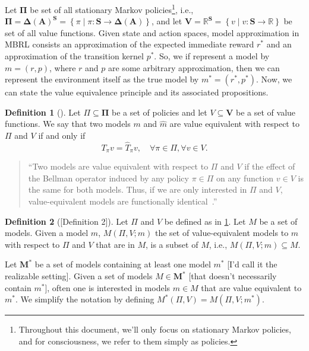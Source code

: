 \documentclass[a4paper]{article}
\theoremstyle{definition}
\newtheorem{definition}{Definition}
\theoremstyle{remark}
\theoremstyle{plain}
\newcommand{\bA}{\mathbf{A}}
\newcommand{\bS}{\mathbf{S}}
\newcommand{\bM}{\mathbf{M}}
\newcommand{\bV}{\mathbf{V}}
\newcommand{\bPi}{\mathbf{\Pi}}
\newcommand{\bDelta}{\mathbf{\Delta}}
\newcommand{\R}{\mathbb{R}}
\begin{document}
Let $\bPi$ be set of all stationary Markov policies\footnote{Throughout this document, we'll only focus on stationary Markov policies, and for consciousness, we refer to them simply as policies.}, i.e., $\bPi = {\bDelta(\bA)}^{\bS} = \left\{\pi \mid \pi: \bS \to \bDelta(\bA) \right\}$, and let $\bV = \R^{\bS} = \left\{v\mid v: \bS \to \R \right\}$ be set of all value functions. Given state and action spaces, model approximation in MBRL consists an approximation of the expected immediate reward $r^*$ and an approximation of the transition kernel $p^*$. So, we if represent a model by $m = (r, p)$, where $r$ and $p$ are some arbitrary approximation, then we can represent the environment itself as the true model by $m^* = (r^*, p^*)$. Now, we can state the value equivalence principle and its associated propositions.
%
\begin{definition}[{\normalfont\citet[Definition 1]{grimm2020value}}]
\label{def:val-eqvlnc}
Let $\Pi \subseteq \bPi$ be a set of policies and let $V \subseteq \bV$ be a set of value functions. We say that two models $m$ and $\hat{m}$ are value equivalent with respect to $\Pi$ and $V$ if and only if
\begin{equation*}
    T_\pi v = \hat{T}_\pi v, \quad \forall\pi \in \Pi, \forall v \in V.
\end{equation*}
\end{definition}
\begin{quote}
    ``Two models are value equivalent with respect to $\Pi$ and $V$ if the effect of the Bellman operator induced by any policy $\pi \in \Pi$ on any function $v \in V$ is the same for both models. Thus, if we are only interested in $\Pi$ and $V$, value-equivalent models are functionally identical~\citep{grimm2020value}.''
\end{quote}
%
\begin{definition}[{\normalfont\citet{grimm2020value}[Definition 2]}]
Let $\Pi$ and $V$ be defined as in \cref{def:val-eqvlnc}. Let $M$ be a set of models. Given a model $m$, $M(\Pi, V; m)$ the set of value-equivalent models to $m$ with respect to $\Pi$ and $V$ that are in $M$, is a subset of $M$, i.e., $M(\Pi, V; m) \subseteq M$.
\end{definition}
%
Let $\bM^*$ be a set of models containing at least one model $m^*$ [I'd call it the realizable setting]. Given a set of models $M \in \bM^*$ [that doesn't necessarily contain $m^*$], often one is interested in models $m \in M$ that are value equivalent to $m^*$. We simplify the notation by defining $M^*(\Pi, V) = M(\Pi, V; m^*)$.
\end{document}
